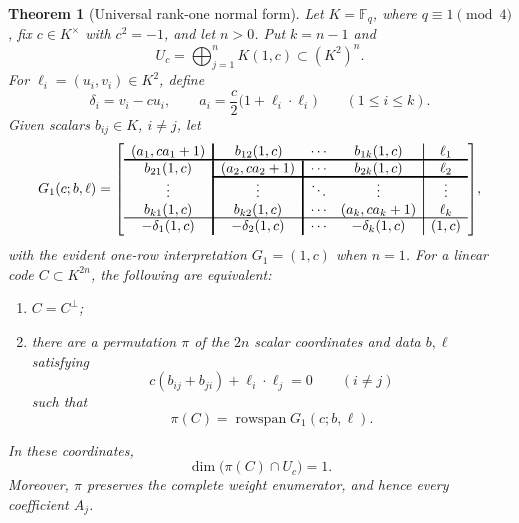 \documentclass[12pt]{article}
\newtheorem{theorem}{Theorem}[section]
\newcommand{\F}{\mathbb{F}}
\begin{document}
\begin{theorem}[Universal rank-one normal form]\label{thm:qary-universal-rank-one}
Let \(K=\F_q\), where \(q\equiv1\pmod4\), fix \(c\in K^\times\) with
\(c^2=-1\), and let \(n>0\).  Put \(k=n-1\) and
\[
U_c=\bigoplus_{j=1}^n K(1,c)\subset(K^2)^n.
\]
For \(\ell_i=(u_i,v_i)\in K^2\), define
\[
\delta_i=v_i-cu_i,\qquad
a_i=\frac c2\bigl(1+\ell_i\cdot\ell_i\bigr)
\qquad(1\le i\le k).
\]
Given scalars \(b_{ij}\in K\), \(i\ne j\), let
\[
G_1(c;b,\ell)=
{\arrayrulewidth=1.2pt
\left[
\begin{array}{c!{\vrule width 1.2pt}c!{\vrule width 1.2pt}cc!{\vrule width 0.6pt}c}
(a_1,ca_1+1)&\multicolumn{1}{c}{b_{12}(1,c)}&\cdots&b_{1k}(1,c)&\ell_1\\[-1pt]
\noalign{\hrule height 1.2pt}
b_{21}(1,c)&(a_2,ca_2+1)&\cdots&b_{2k}(1,c)&\ell_2\\[-1pt]
\cline{2-5}
\vdots&\vdots&\ddots&\vdots&\vdots\\
b_{k1}(1,c)&b_{k2}(1,c)&\cdots&(a_k,ca_k+1)&\ell_k\\[-1pt]
\noalign{\hrule height 0.6pt}
-\delta_1(1,c)&-\delta_2(1,c)&\cdots&-\delta_k(1,c)&(1,c)
\end{array}
\right]},
\]
with the evident one-row interpretation \(G_1=(1,c)\) when \(n=1\).
For a linear code \(C\subset K^{2n}\), the following are equivalent:
\begin{enumerate}
\item \(C=C^\perp\);
\item there are a permutation \(\pi\) of the \(2n\) scalar coordinates and
data \(b,\ell\) satisfying
\begin{equation}
c(b_{ij}+b_{ji})+\ell_i\cdot\ell_j=0
\qquad(i\ne j)
\label{eq:universal-rank-one-relation}
\end{equation}
such that
\[
\pi(C)=\operatorname{rowspan}G_1(c;b,\ell).
\]
\end{enumerate}
In these coordinates,
\[
\dim\bigl(\pi(C)\cap U_c\bigr)=1.
\]
Moreover, \(\pi\) preserves the complete weight enumerator, and hence every
coefficient \(A_j\).
\end{theorem}
\end{document}
